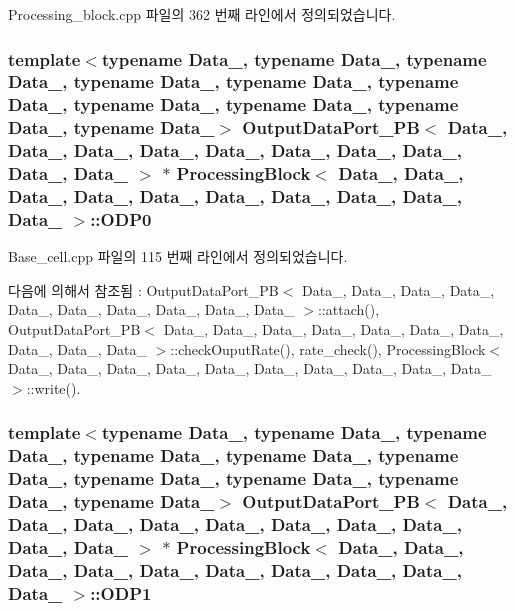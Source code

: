 Processing\+\_\+block.\+cpp 파일의 362 번째 라인에서 정의되었습니다.

\subsubsection[{\texorpdfstring{O\+D\+P0}{ODP0}}]{\setlength{\rightskip}{0pt plus 5cm}template$<$typename Data\+\_, typename Data\+\_, typename Data\+\_, typename Data\+\_, typename Data\+\_, typename Data\+\_, typename Data\+\_, typename Data\+\_, typename Data\+\_, typename Data\+\_$>$ {\bf Output\+Data\+Port\+\_\+\+PB}$<$ Data\+\_, Data\+\_, Data\+\_, Data\+\_, Data\+\_, Data\+\_, Data\+\_, Data\+\_, Data\+\_, Data\+\_ $>$ $\ast$ {\bf Processing\+Block}$<$ Data\+\_, Data\+\_, Data\+\_, Data\+\_, Data\+\_, Data\+\_, Data\+\_, Data\+\_, Data\+\_, Data\+\_ $>$\+::O\+D\+P0}\hypertarget{classProcessingBlock_aca43cbf4092036fe57cd168083dbfae1}{}\label{classProcessingBlock_aca43cbf4092036fe57cd168083dbfae1}


Base\+\_\+cell.\+cpp 파일의 115 번째 라인에서 정의되었습니다.



다음에 의해서 참조됨 \+:  Output\+Data\+Port\+\_\+\+P\+B$<$ Data\+\_, Data\+\_, Data\+\_, Data\+\_, Data\+\_, Data\+\_, Data\+\_, Data\+\_, Data\+\_, Data\+\_ $>$\+::attach(), Output\+Data\+Port\+\_\+\+P\+B$<$ Data\+\_, Data\+\_, Data\+\_, Data\+\_, Data\+\_, Data\+\_, Data\+\_, Data\+\_, Data\+\_, Data\+\_ $>$\+::check\+Ouput\+Rate(), rate\+\_\+check(), Processing\+Block$<$ Data\+\_, Data\+\_, Data\+\_, Data\+\_, Data\+\_, Data\+\_, Data\+\_, Data\+\_, Data\+\_, Data\+\_ $>$\+::write().

\subsubsection[{\texorpdfstring{O\+D\+P1}{ODP1}}]{\setlength{\rightskip}{0pt plus 5cm}template$<$typename Data\+\_, typename Data\+\_, typename Data\+\_, typename Data\+\_, typename Data\+\_, typename Data\+\_, typename Data\+\_, typename Data\+\_, typename Data\+\_, typename Data\+\_$>$ {\bf Output\+Data\+Port\+\_\+\+PB}$<$ Data\+\_, Data\+\_, Data\+\_, Data\+\_, Data\+\_, Data\+\_, Data\+\_, Data\+\_, Data\+\_, Data\+\_ $>$ $\ast$ {\bf Processing\+Block}$<$ Data\+\_, Data\+\_, Data\+\_, Data\+\_, Data\+\_, Data\+\_, Data\+\_, Data\+\_, Data\+\_, Data\+\_ $>$\+::O\+D\+P1}\hypertarget{classProcessingBlock_afa89c1efafaefae506d5f1f2bff682a5}{}\label{classProcessingBlock_afa89c1efafaefae506d5f1f2bff682a5}


